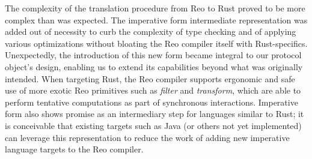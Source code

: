 The complexity of the translation procedure from Reo to Rust
proved to be more complex than was expected. The imperative form intermediate representation was added out of necessity to curb the complexity of type checking and of applying various optimizations without bloating the Reo compiler itself with Rust-specifics. Unexpectedly, the introduction of this new form became integral to our protocol object's design, enabling us to extend its capabilities beyond what was originally intended. When targeting Rust, the Reo compiler supports ergonomic and safe use of more exotic Reo primitives such as \textit{filter} and \textit{transform}, which are able to perform tentative computations as part of synchronous interactions. Imperative form also shows promise as an intermediary step for languages similar to Rust; it is conceivable that existing targets such as Java (or others not yet implemented) can leverage this representation to reduce the work of adding new imperative language targets to the Reo compiler. 

